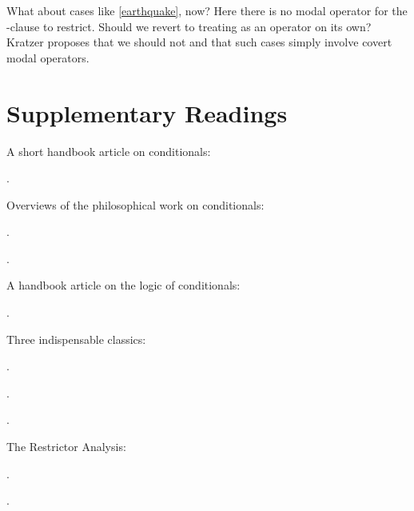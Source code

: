 What about cases like \ref{earthquake}, now? Here there is no modal operator for the -clause to restrict. Should we revert to treating  as an operator on its own? Kratzer proposes that we should not and that such cases simply involve covert modal operators. %


\newpage\section*{Supplementary Readings} \label{sec:suppl-read-conditionals}

 {}

{\setlength{\parindent}{0pt}\setlength{\parskip}{6pt}

A short handbook article on conditionals:
\begin{bibentrylist}
	\item{}.
\end{bibentrylist}

Overviews of the philosophical work on conditionals:
\begin{bibentrylist}
	\item {}.
	\item {}.
\end{bibentrylist}

A handbook article on the logic of conditionals:
\begin{bibentrylist}
	\item {}.
\end{bibentrylist}

Three indispensable classics:
\begin{bibentrylist}
	\item {}.
	\item {}.
	\item {}. 
\end{bibentrylist}

The Restrictor Analysis:
\begin{bibentrylist}
	\item {}. 
	\item {}.
\end{bibentrylist}

}
